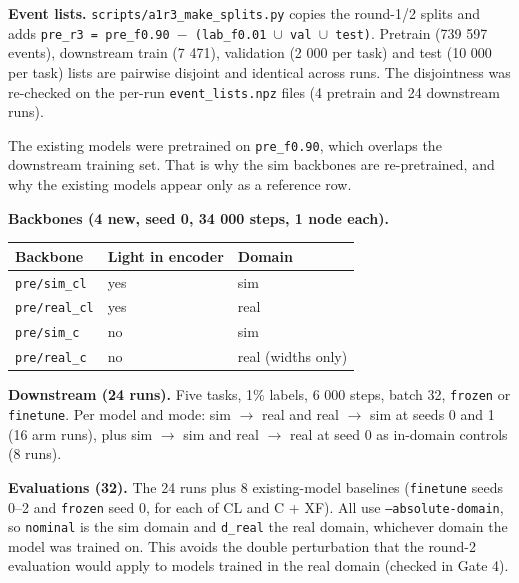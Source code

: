 \documentclass[10pt,a4paper]{article}
\begin{document}
\textbf{Event lists.} \texttt{scripts/\allowbreak{}a1r3\_\allowbreak{}make\_\allowbreak{}splits.py} copies the round-1/2 splits and adds \texttt{pre\_\allowbreak{}r3 = pre\_\allowbreak{}f0.90 $-$ (lab\_\allowbreak{}f0.01 $\cup$ val $\cup$ test)}. Pretrain (739 597 events), downstream train (7 471), validation (2 000 per task) and test (10 000 per task) lists are pairwise disjoint and identical across runs. The disjointness was re-checked on the per-run \texttt{event\_\allowbreak{}lists.npz} files (4 pretrain and 24 downstream runs).

The existing models were pretrained on \texttt{pre\_\allowbreak{}f0.90}, which overlaps the downstream training set. That is why the sim backbones are re-pretrained, and why the existing models appear only as a reference row.

\textbf{Backbones (4 new, seed 0, 34 000 steps, 1 node each).}

\begin{center}\small
\setlength{\tabcolsep}{3pt}\renewcommand{\arraystretch}{1.15}
\begin{tabularx}{\linewidth}{LLL}
\toprule
\textbf{Backbone} & \textbf{Light in encoder} & \textbf{Domain} \\
\midrule
\texttt{pre/\allowbreak{}sim\_\allowbreak{}cl} & yes & sim \\
\texttt{pre/\allowbreak{}real\_\allowbreak{}cl} & yes & real \\
\texttt{pre/\allowbreak{}sim\_\allowbreak{}c} & no & sim \\
\texttt{pre/\allowbreak{}real\_\allowbreak{}c} & no & real (widths only) \\
\bottomrule
\end{tabularx}
\end{center}
\textbf{Downstream (24 runs).} Five tasks, 1\% labels, 6 000 steps, batch 32, \texttt{frozen} or \texttt{finetune}. Per model and mode: sim $\rightarrow$ real and real $\rightarrow$ sim at seeds 0 and 1 (16 arm runs), plus sim $\rightarrow$ sim and real $\rightarrow$ real at seed 0 as in-domain controls (8 runs).

\textbf{Evaluations (32).} The 24 runs plus 8 existing-model baselines (\texttt{finetune} seeds 0--2 and \texttt{frozen} seed 0, for each of CL and C + XF). All use \texttt{--absolute-domain}, so \texttt{nominal} is the sim domain and \texttt{d\_\allowbreak{}real} the real domain, whichever domain the model was trained on. This avoids the double perturbation that the round-2 evaluation would apply to models trained in the real domain (checked in Gate 4).
\end{document}

